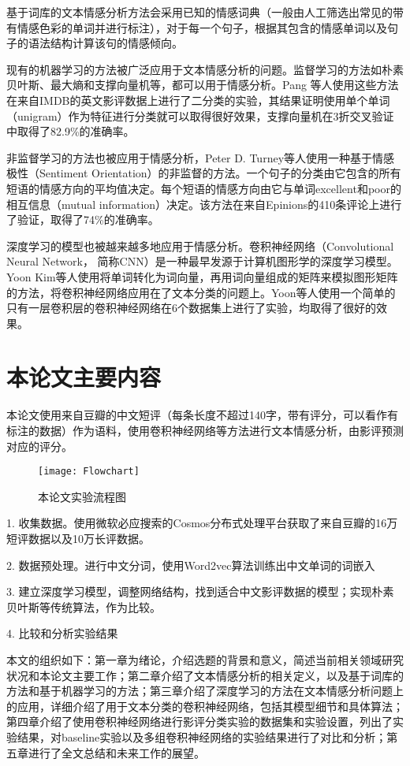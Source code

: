 基于词库的文本情感分析方法会采用已知的情感词典（一般由人工筛选出常见的带有情感色彩的单词并进行标注），对于每一个句子，根据其包含的情感单词以及句子的语法结构计算该句的情感倾向\cite{taboada.2011.lexicon}。

现有的机器学习的方法被广泛应用于文本情感分析的问题。监督学习的方法如朴素贝叶斯、最大熵和支撑向量机等，都可以用于情感分析。Pang 等人使用这些方法在来自IMDB的英文影评数据上进行了二分类的实验，其结果证明使用单个单词（unigram）作为特征进行分类就可以取得很好效果，支撑向量机在3折交叉验证中取得了82.9\%的准确率\cite{Pang.2002.ml}。

非监督学习的方法也被应用于情感分析，Peter D. Turney等人使用一种基于情感极性（Sentiment Orientation）的非监督的方法\cite{turney.2002.thumbs}。一个句子的分类由它包含的所有短语的情感方向的平均值决定。每个短语的情感方向由它与单词excellent和poor的相互信息（mutual information）决定。该方法在来自Epinions的410条评论上进行了验证，取得了74\%的准确率。

深度学习的模型也被越来越多地应用于情感分析。卷积神经网络（Convolutional Neural Network， 简称CNN）是一种最早发源于计算机图形学的深度学习模型。Yoon Kim等人使用将单词转化为词向量，再用词向量组成的矩阵来模拟图形矩阵的方法，将卷积神经网络应用在了文本分类的问题上\cite{kim.2014.convolutional}。Yoon等人使用一个简单的只有一层卷积层的卷积神经网络在6个数据集上进行了实验，均取得了很好的效果。

\section{本论文主要内容}
本论文使用来自豆瓣的中文短评（每条长度不超过140字，带有评分，可以看作有标注的数据）作为语料，使用卷积神经网络等方法进行文本情感分析，由影评预测对应的评分。

\begin{figure}[ht]
\centering
\texttt{[image: Flowchart]}
\caption{本论文实验流程图} \label{fig:Flowchart}
\end{figure}


1.	收集数据。使用微软必应搜索的Cosmos分布式处理平台获取了来自豆瓣的16万短评数据以及10万长评数据。

2.	数据预处理。进行中文分词，使用Word2vec算法训练出中文单词的词嵌入

3.	建立深度学习模型，调整网络结构，找到适合中文影评数据的模型；实现朴素贝叶斯等传统算法，作为比较。

4.	比较和分析实验结果

本文的组织如下：第一章为绪论，介绍选题的背景和意义，简述当前相关领域研究状况和本论文主要工作；第二章介绍了文本情感分析的相关定义，以及基于词库的方法和基于机器学习的方法；第三章介绍了深度学习的方法在文本情感分析问题上的应用，详细介绍了用于文本分类的卷积神经网络，包括其模型细节和具体算法；第四章介绍了使用卷积神经网络进行影评分类实验的数据集和实验设置，列出了实验结果，对baseline实验以及多组卷积神经网络的实验结果进行了对比和分析；第五章进行了全文总结和未来工作的展望。
